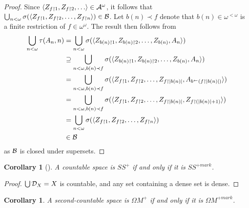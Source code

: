 \documentclass{amsart}
\theoremstyle{plain}
\newtheorem{corollary}[theorem]{Corollary}
\theoremstyle{definition}
\theoremstyle{remark}
\theoremstyle{plain}
\theoremstyle{definition}
\theoremstyle{remark}
\begin{document}
\begin{proof}
  Since \(\<Z_{f\rest1},Z_{f\rest2},\dots\>\in\mc A^\omega\), it follows
  that
  \(
    \bigcup_{n<\omega}\sigma(\langle Z_{f\restriction1},Z_{f\restriction2},\dots,Z_{f\restriction n}\rangle)
      \in
    \mathcal{B}
  \).
  Let \(b(n)\prec f\) denote that \(b(n)\in\omega^{<\omega}\) is a finite
  restriction of \(f\in\omega^\omega\).
  The result then follows from
  \begin{align*}
    \bigcup_{n<\omega}\tau(A_n,n)
      & =
    \bigcup_{n<\omega}
    \sigma(\langle Z_{b(n)\restriction 1},Z_{b(n)\restriction 2},\dots,Z_{b(n)},A_n\rangle)
      \\ & \supseteq
    \bigcup_{n<\omega,b(n)\prec f}
    \sigma(\langle Z_{b(n)\restriction 1},Z_{b(n)\restriction 2},\dots,Z_{b(n)},A_n\rangle)
      \\ & =
    \bigcup_{n<\omega,b(n)\prec f}
    \sigma(\langle Z_{f\restriction 1},Z_{f\restriction 2},\dots,Z_{f\restriction|b(n)|},A_{b^{\leftarrow}(f\restriction|b(n)|)}\rangle)
      \\ & =
    \bigcup_{n<\omega,b(n)\prec f}
    \sigma(\langle Z_{f\restriction 1},Z_{f\restriction 2},\dots,Z_{f\restriction|b(n)|},Z_{f\restriction(|b(n)|+1)}\rangle)
      \\ & =
    \bigcup_{n<\omega}
    \sigma(\langle Z_{f\restriction 1},Z_{f\restriction 2},\dots,Z_{f\restriction n}\rangle)
      \\ & \in
    \mathcal{B}
  \end{align*}
  as \(\mathcal{B}\) is closed under supersets.
\end{proof}

\begin{corollary}[\cite{MR2868880}]
  A countable space is \(SS^+\) if and only if it is
  \(SS^{+mark}\).
\end{corollary}

\begin{proof}
  \(\bigcup\mathcal{D}_X=X\) is countable, and any set containing a dense
  set is dense.
\end{proof}

\begin{corollary}
  A second-countable space is \(\Omega M^+\) if and only if
  it is \(\Omega M^{+mark}\).
\end{corollary}
\end{document}
